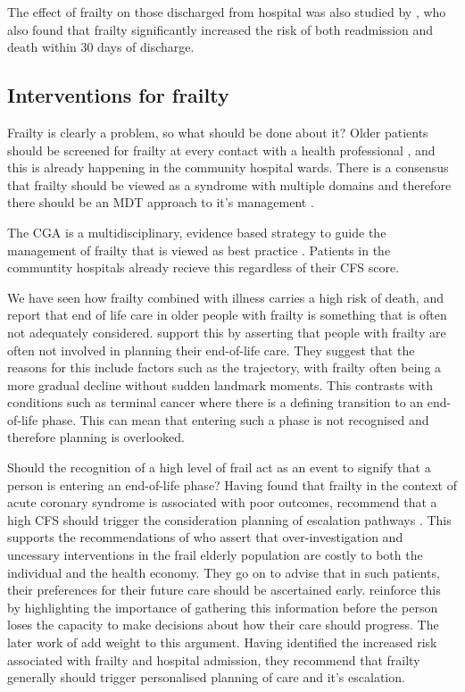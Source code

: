 \documentclass
[
	12pt,
	a4paper,
	oneside,
]{article}
\begin{document}
The effect of frailty on those discharged from hospital was also studied by 
\parencite{kahlon:15}, who also found that frailty significantly increased the 
risk of both readmission and death within 30 days of discharge.

\subsection{Interventions for frailty}
Frailty is clearly a problem, so what should be done about it? Older patients 
should be screened for frailty at every contact with a health professional 
\parencite{bgs:14}, and 
this is already happening in the community hospital wards. There is a consensus that 
frailty should be viewed as a syndrome with multiple domains and therefore
there should be an MDT approach to it's management \parencite{vellas:16}.

The CGA is a multidisciplinary, evidence based strategy to guide the management 
of frailty that is viewed as best practice \parencite{silver:12, bgs:14, oliver:14}. Patients
in the communtity hospitals already recieve this regardless of their CFS score.

We have seen how frailty combined with illness carries a high risk of death, and 
\textcite{silver:12} report that end of life care in older people with frailty
is something that is often not adequately considered. \textcite{oliver:14} support this
by asserting that people with frailty are often not involved in planning their 
end-of-life care. They suggest that the reasons for this include factors such as
the trajectory, with frailty often being a more gradual decline without sudden 
landmark moments. This contrasts with conditions such as terminal cancer where there 
is a defining transition to an end-of-life phase. This can mean that entering such a
phase is not recognised and therefore planning is overlooked. 

Should the recognition of a high level of frail act as an event to signify
that a person is entering an end-of-life phase? Having found that frailty in the 
context of acute coronary syndrome is associated
with poor outcomes, \textcite{kang:15} recommend that a high CFS should
trigger the consideration planning of escalation pathways \parencite{kang:15}.
This supports the recommendations of \textcite{silver:12} who assert that over-investigation
and uncessary interventions in the frail elderly population are costly to both the
individual and the health economy. They go on to advise that in such patients, 
their preferences for their future care should be ascertained early. \textcite{oliver:14} 
reinforce this by highlighting the importance of gathering this information
before the person loses the capacity to make decisions about how their care should
progress. The later work of \textcite{romero-ortuno:16} add weight to this argument.
Having identified the increased risk associated with frailty and hospital admission, 
they recommend that frailty generally should trigger personalised planning of
care and it's escalation.
\end{document}
